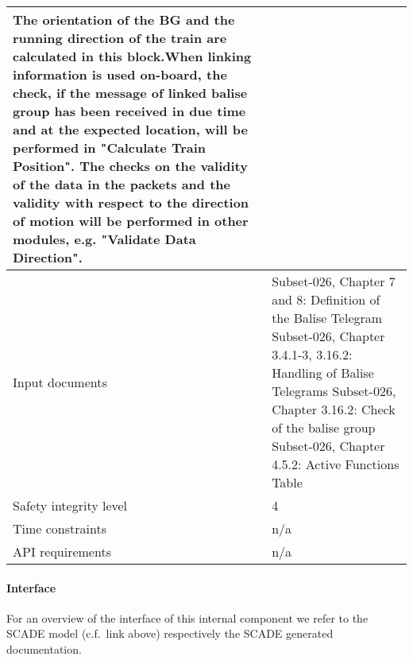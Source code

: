 \begin{longtable}{p{}p{}}
The orientation of the BG and the running direction of the train are
calculated in this block.When linking information is used on-board,
the check, if the message of linked balise group has been received
in due time and at the expected location, will be performed in
"Calculate Train Position". The checks on the validity of the data in
the packets and the validity with respect to the direction of motion
will be performed in other modules, e.g. "Validate Data Direction".\\
\midrule
Input documents	& 
Subset-026, Chapter 7 and 8: Definition of the Balise Telegram\newline
Subset-026, Chapter 3.4.1-3, 3.16.2: Handling of Balise Telegrams\newline
Subset-026, Chapter 3.16.2: Check of the balise group\newline
Subset-026, Chapter 4.5.2: Active Functions Table\\
\midrule
Safety integrity level		& 4 \\
\midrule
Time constraints		& n/a \\
\midrule
API requirements 		& n/a \\
\bottomrule
\end{longtable}


\paragraph{Interface}

For an overview of the interface of this internal component we refer to the SCADE model (c.f.~link above) respectively the SCADE generated documentation.
